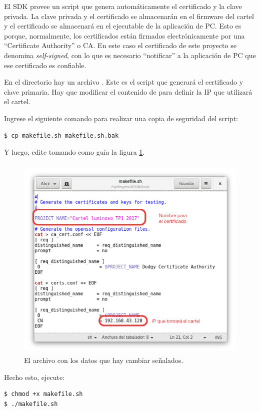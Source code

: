 El SDK provee un script que genera automáticamente el certificado y la clave privada. La clave privada y el certificado se almacenarán en el firmware del cartel y el certificado se almacenará en el ejecutable de la aplicación de PC. Esto es porque, normalmente, los certificados están firmados electrónicamente por una \enquote{Certificate Authority} o CA. En este caso el certificado de este proyecto se denomina \emph{self-signed}, con lo que es necesario \enquote{notificar} a la aplicación de PC que ese certificado es confiable.

En el directorio  hay un archivo . Este es el script que generará el certificado y clave primaria. Hay que modificar el contenido de  para definir la IP que utilizará el cartel.

Ingrese el siguiente comando para realizar una copia de seguridad del script:
\begin{lstlisting}
$ cp makefile.sh makefile.sh.bak
\end{lstlisting}

Y luego, edite  tomando como guía la figura \ref{fig:guia-cert}.

\begin{figure}[!hbpt]
	\centering
	\includegraphics[height=10cm]{imagenes/cert-screenshot.jpg}
	\caption{El archivo  con los datos que hay cambiar señalados.}
	\label{fig:guia-cert}
\end{figure}

Hecho esto, ejecute:

\begin{lstlisting}
$ chmod +x makefile.sh
$ ./makefile.sh
\end{lstlisting}

